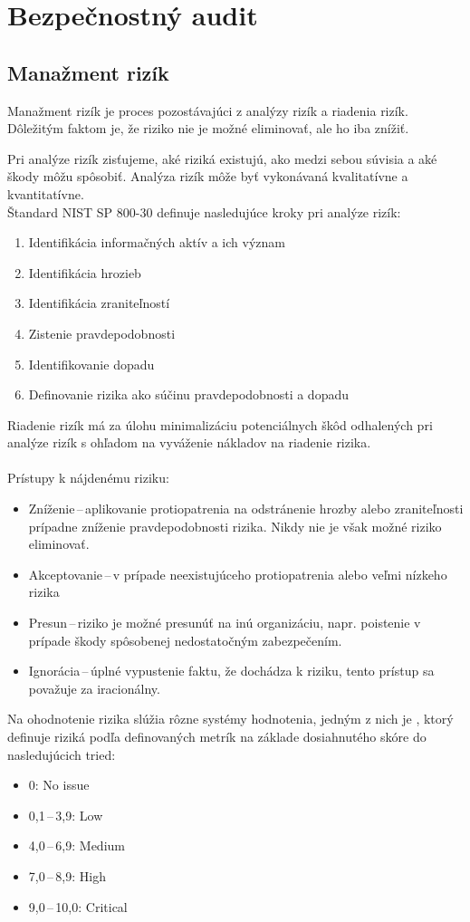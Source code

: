 \chapter{Bezpečnostný audit}
{}

\section{Manažment rizík}
Manažment rizík je proces pozostávajúci z analýzy rizík a riadenia rizík\cite{McMillan2018}. Dôležitým faktom je, že riziko nie je možné eliminovať, ale ho iba znížiť.

Pri analýze rizík zisťujeme, aké riziká existujú, ako medzi sebou súvisia a aké škody môžu spôsobiť. Analýza rizík môže byť vykonávaná kvalitatívne a kvantitatívne.\\ 
\noindent
Štandard NIST SP 800-30\cite{7TVhmfuQFbsOANAz} definuje nasledujúce kroky pri analýze rizík:

\begin{enumerate}
	\item Identifikácia informačných aktív a ich význam
	\item Identifikácia hrozieb
	\item Identifikácia zraniteľností
	\item Zistenie pravdepodobnosti
	\item Identifikovanie dopadu
	\item Definovanie rizika ako súčinu pravdepodobnosti a dopadu
\end{enumerate} 
\vspace{2em}
Riadenie rizík má za úlohu minimalizáciu potenciálnych škôd odhalených pri analýze rizík s ohľadom na vyváženie nákladov na riadenie rizika. 
\\\\
\noindent
Prístupy k nájdenému riziku\cite{Vyncke2008}\cite{McMillan2018}:
\begin{itemize}
	\item Zníženie\,--\,aplikovanie protiopatrenia na odstránenie hrozby alebo zraniteľnosti prípadne zníženie pravdepodobnosti rizika. Nikdy nie je však možné riziko eliminovať.
	
	\item Akceptovanie\,--\,v prípade neexistujúceho protiopatrenia alebo veľmi nízkeho rizika
	
	\item Presun\,--\,riziko je možné presunúť na inú organizáciu, napr. poistenie v prípade škody spôsobenej nedostatočným zabezpečením.
	
	\item Ignorácia\,--\,úplné vypustenie faktu, že dochádza k riziku, tento prístup sa považuje za iracionálny.
\end{itemize}
\vspace{2em}
\noindent
Na ohodnotenie rizika slúžia rôzne systémy hodnotenia, jedným z nich je  , ktorý definuje riziká podľa definovaných metrík na základe dosiahnutého skóre do nasledujúcich tried:

\begin{itemize}
	\item 0: No issue
	\item 0,1\,--\,3,9: Low
	\item 4,0\,--\,6,9: Medium
	\item 7,0\,--\,8,9: High
	\item 9,0\,--\,10,0: Critical
\end{itemize} 